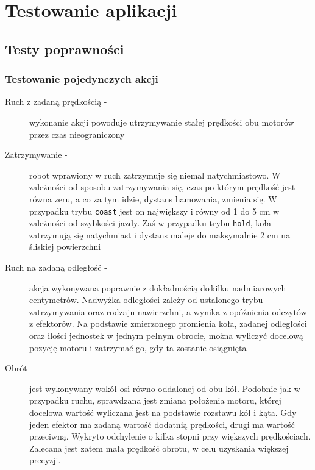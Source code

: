 \chapter{Testowanie aplikacji}
\label{ch:testowanie}

\section{Testy poprawności}


\subsection{Testowanie pojedynczych akcji}

\begin{description}
    \item[Ruch z zadaną prędkością -]wykonanie akcji powoduje utrzymywanie stałej prędkości obu motorów przez czas nieograniczony
    \item[Zatrzymywanie -]robot wprawiony w ruch zatrzymuje się niemal natychmiastowo. W zależności od sposobu zatrzymywania się, czas po którym prędkość jest równa zeru, a co za tym idzie, dystans hamowania, zmienia się. W\,przypadku trybu {\tt coast} jest on największy i równy od 1 do 5 cm w zależności od szybkości jazdy. Zaś w przypadku trybu {\tt hold}, koła zatrzymują się natychmiast i dystans maleje do maksymalnie 2 cm na śliskiej powierzchni
    \item[Ruch na zadaną odległość -]akcja wykonywana poprawnie z dokładnością do\,kilku nadmiarowych centymetrów. Nadwyżka odległości zależy od ustalonego trybu zatrzymywania oraz rodzaju nawierzchni, a wynika z opóźnienia odczytów z efektorów. Na podstawie zmierzonego promienia koła, zadanej odległości oraz ilości jednostek w jednym pełnym obrocie, można wyliczyć docelową pozycję motoru i zatrzymać go, gdy ta zostanie osiągnięta
    \item[Obrót -]jest wykonywany wokół osi równo oddalonej od obu kół. Podobnie jak w przypadku ruchu, sprawdzana jest zmiana położenia motoru, której docelowa wartość wyliczana jest na podstawie rozstawu kół i kąta. Gdy jeden efektor ma zadaną wartość dodatnią prędkości, drugi ma wartość przeciwną. Wykryto odchylenie o kilka stopni przy większych prędkościach. Zalecana jest zatem mała prędkość obrotu, w celu uzyskania większej precyzji.

\end{description}

